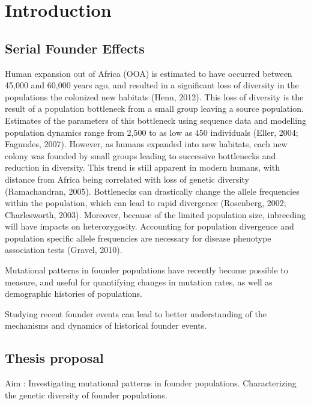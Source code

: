 \documentclass[
11pt, %
oneside, %
english, %
doublespacing, %
headsepline, %
]{MastersDoctoralThesis} %
\begin{document}

\mainmatter %

\pagestyle{thesis} %


\section{Introduction}

\subsection{Serial Founder Effects}
Human expansion out of Africa (OOA) is estimated to have occurred between 45,000 and 60,000 years ago, and resulted in a significant loss of diversity in the populations the colonized new habitats (Henn, 2012). 
This loss of diversity is the result of a population bottleneck from a small group leaving a source population. 
Estimates of the parameters of this bottleneck using sequence data and modelling population dynamics range from 2,500 to as low as 450 individuals (Eller, 2004; Fagundes, 2007).
However, as humans expanded into new habitats, each new colony was founded by small groups leading to successive bottlenecks and reduction in diversity.
This trend is still apparent in modern humans, with distance from Africa being correlated with loss of genetic diversity (Ramachandran, 2005).
Bottlenecks can drastically change the allele frequencies within the population, which can lead to rapid divergence (Rosenberg, 2002; Charlesworth, 2003).
Moreover, because of the limited population size, inbreeding will have impacts on heterozygosity.
Accounting for population divergence and population specific allele frequencies are necessary for disease phenotype association tests (Gravel, 2010).

Mutational patterns in founder populations have recently become possible to measure, and useful for quantifying changes in mutation rates, as well as demographic histories of populations.

Studying recent founder events can lead to better understanding of the mechanisms and dynamics of historical founder events. 



\subsection{Thesis proposal}
Aim : Investigating mutational patterns in founder populations. 
Characterizing the genetic diversity of founder populations. 
\end{document}
